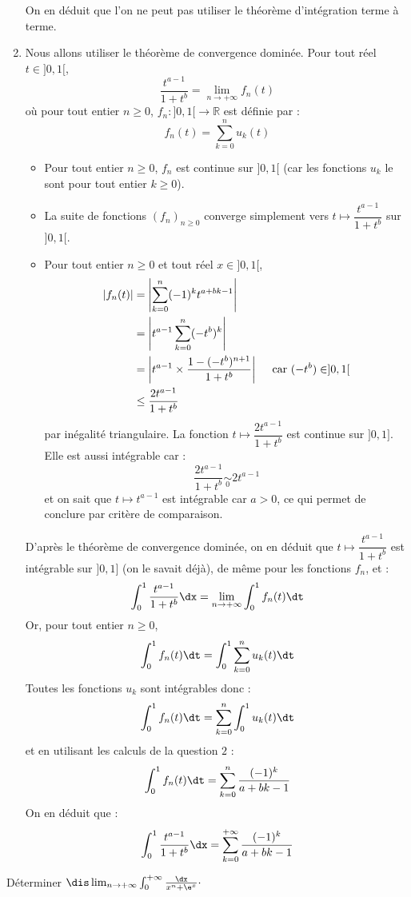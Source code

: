 \documentclass[a4paper,10pt]{report}
\begin{document}
\begin{enumerate}
\noindent On en déduit que l'on ne peut pas utiliser le théorème d'intégration terme à terme.
\item Nous allons utiliser le théorème de convergence dominée. Pour tout réel $t \in ]0,1[$,
$$ \dfrac{t^{a-1}}{1+t^b} = \lim_{n \rightarrow + \infty} f_n(t)$$
où pour tout entier $n \geq 0$, $f_n : ]0,1[ \rightarrow \mathbb{R}$ est définie par :
$$ f_n(t) = \sum_{k=0}^n u_k(t) $$
\begin{itemize}
\item Pour tout entier $n \geq 0$, $f_n$ est continue sur $]0,1[$ (car les fonctions $u_k$ le sont pour tout entier $k \geq 0$).
\item La suite de fonctions $(f_n)_{n \geq 0}$ converge simplement vers $t \mapsto \dfrac{t^{a-1}}{1+t^b}$ sur $]0,1[$.
\item Pour tout entier $n \geq 0$ et tout réel $x \in ]0,1[$,
\begin{align*}
\vert f_n(t) \vert & = \left\vert \sum_{k=0}^n (-1)^k t^{a+bk-1} \right\vert \\
& =   \left\vert t^{a-1} \sum_{k=0}^n (-t^b)^k  \right\vert \\
& = \left\vert t^{a-1} \times \dfrac{1-(-t^b)^{n+1}}{1+t^b} \right\vert \quad \hbox{ car } (-t^b) \in ]0,1[ \\
& \leq \dfrac{2 t^{a-1}}{1+t^b}
\end{align*}
par inégalité triangulaire. La fonction $t \mapsto \dfrac{2 t^{a-1}}{1+t^b}$ est continue sur $]0,1]$. Elle est aussi intégrable car :
$$ \dfrac{2 t^{a-1}}{1+t^b} \underset{0}{\sim} 2 t^{a-1}$$
et on sait que $t \mapsto t^{a-1}$ est intégrable car $a>0$, ce qui permet de conclure par critère de comparaison.
\end{itemize}
D'après le théorème de convergence dominée, on en déduit que $t \mapsto \dfrac{t^{a-1}}{1+t^b}$ est intégrable sur $]0,1]$ (on le savait déjà), de même pour les fonctions $f_n$, et :
$$ \int_0^1 \dfrac{t^{a-1}}{1+t^b} \dx = \lim_{n \rightarrow + \infty} \int_0^1 f_n(t) \dt$$
Or, pour tout entier $n \geq 0$,
$$ \int_0^1 f_n(t) \dt = \int_0^1 \sum_{k=0}^n u_k(t) \dt $$
Toutes les fonctions $u_k$ sont intégrables donc :
$$  \int_0^1 f_n(t) \dt = \sum_{k=0}^n \int_0^1  u_k(t) \dt $$
et en utilisant les calculs de la question $2$ :
$$  \int_0^1 f_n(t) \dt = \sum_{k=0}^n \dfrac{(-1)^k}{a+bk-1}$$
On en déduit que :
$$\int_0^1 \dfrac{t^{a-1}}{1+t^b} \dx =\sum_{k=0}^{+ \infty} \dfrac{(-1)^k}{a+bk-1}$$
 \end{enumerate}
 
 \begin{Exa} Déterminer $\dis \lim_{n \rightarrow + \infty} \int_{0}^{ + \infty} \frac{\dx}{x^{n} + \e^{x}} \cdot$
 \end{Exa}
 
\end{document}
